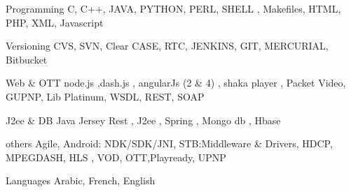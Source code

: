 


\begin{cvskills}


\cvskill
{Programming} %
{C, C++, JAVA, PYTHON, PERL, SHELL , Makefiles, HTML, PHP, XML, Javascript  }%

\cvskill
{Versioning}
{CVS, SVN, Clear CASE, RTC,  JENKINS, GIT, MERCURIAL, Bitbucket }

\cvskill
{Web \& OTT} %
{node.js ,dash.js , angularJs (2 \& 4) , shaka player ,  Packet Video, GUPNP, Lib Platinum, WSDL, REST, SOAP }%

\cvskill
{J2ee \& DB} %
{Java Jersey Rest , J2ee , Spring  , Mongo db , Hbase} %

\cvskill
{others}
{ Agile, Android: NDK/SDK/JNI, STB:Middleware \& Drivers, HDCP, MPEGDASH, HLS , VOD, OTT,Playready, UPNP}

\cvskill
{Languages} %
{Arabic, French, English} %


\end{cvskills}
